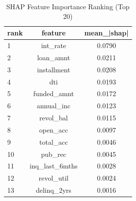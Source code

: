 \begin{table}
\centering
\caption{SHAP Feature Importance Ranking (Top 20)}
\label{tab:shap_ranking}
\begin{tabular}{lcc}
\toprule
rank & feature & mean_|shap| \\
\midrule
1 & int_rate & 0.0790 \\
2 & loan_amnt & 0.0211 \\
3 & installment & 0.0208 \\
4 & dti & 0.0193 \\
5 & funded_amnt & 0.0172 \\
6 & annual_inc & 0.0123 \\
7 & revol_bal & 0.0115 \\
8 & open_acc & 0.0097 \\
9 & total_acc & 0.0046 \\
10 & pub_rec & 0.0045 \\
11 & inq_last_6mths & 0.0028 \\
12 & revol_util & 0.0024 \\
13 & delinq_2yrs & 0.0016 \\
\bottomrule
\end{tabular}
\end{table}
